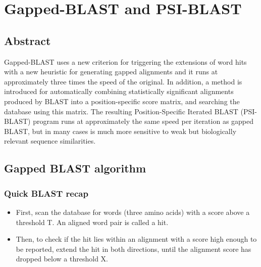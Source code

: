 \chapter{Gapped-BLAST and PSI-BLAST}

    \section{Abstract}
    Gapped-BLAST uses a new criterion for triggering the extensions of word hits with a new heuristic for generating gapped alignments and it runs at approximately three times the speed of the original. In addition, a method is introduced for automatically combining statistically significant alignments produced by BLAST into a position-specific score matrix, and searching the database using this matrix. The resulting Position-Specific Iterated BLAST (PSI-BLAST) program runs at approximately the same speed per iteration as gapped BLAST, but in many cases is much more sensitive to weak but biologically relevant sequence similarities.

    \section{Gapped BLAST algorithm}
    
        \subsection{Quick BLAST recap}
            \begin{itemize}
                \item First, scan the database for words (three amino acids) with a score above a  threshold T. An aligned word pair is called a hit.
                \item Then, to check if the hit lies within an alignment with a score high enough to be reported, extend the hit in both directions, until the alignment score has dropped below a threshold X.
            \end{itemize}
        
